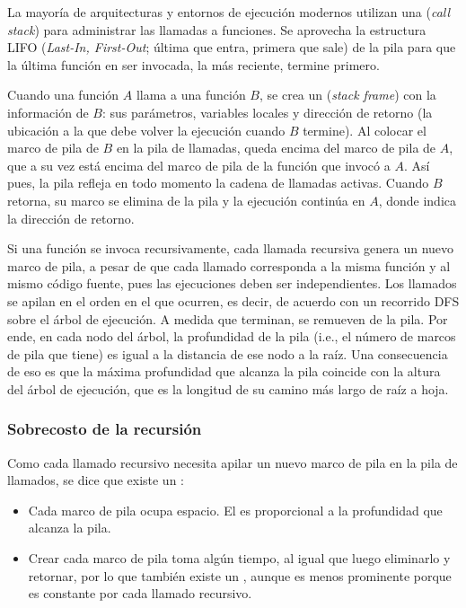 La mayoría de arquitecturas y entornos de ejecución modernos utilizan una  (\textit{call stack}) para administrar las llamadas a funciones. Se aprovecha la estructura LIFO (\textit{Last-In, First-Out}; última que entra, primera que sale) de la pila para que la última función en ser invocada, la más reciente, termine primero.

Cuando una función \(A\) llama a una función \(B\), se crea un  (\textit{stack frame}) con la información de \(B\): sus parámetros, variables locales y dirección de retorno (la ubicación a la que debe volver la ejecución cuando \(B\) termine). Al colocar el marco de pila de \(B\) en la pila de llamadas, queda encima del marco de pila de \(A\), que a su vez está encima del marco de pila de la función que invocó a \(A\). Así pues, la pila refleja en todo momento la cadena de llamadas activas. Cuando \(B\) retorna, su marco se elimina de la pila y la ejecución continúa en \(A\), donde indica la dirección de retorno.

Si una función se invoca recursivamente, cada llamada recursiva genera un nuevo marco de pila, a pesar de que cada llamado corresponda a la misma función y al mismo código fuente, pues las ejecuciones deben ser independientes. Los llamados se apilan en el orden en el que ocurren, es decir, de acuerdo con un recorrido DFS sobre el árbol de ejecución. A medida que terminan, se remueven de la pila. Por ende, en cada nodo del árbol, la profundidad de la pila (i.e., el número de marcos de pila que tiene) es igual a la distancia de ese nodo a la raíz. Una consecuencia de eso es que la máxima profundidad que alcanza la pila coincide con la altura del árbol de ejecución, que es la longitud de su camino más largo de raíz a hoja.

\subsubsection{Sobrecosto de la recursión}
\label{sec:sobrecosto_recursion}

Como cada llamado recursivo necesita apilar un nuevo marco de pila en la pila de llamados, se dice que existe un :
\begin{itemize}
  \item Cada marco de pila ocupa espacio. El  es proporcional a la profundidad que alcanza la pila.
  \item Crear cada marco de pila toma algún tiempo, al igual que luego eliminarlo y retornar, por lo que también existe un , aunque es menos prominente porque es constante por cada llamado recursivo.
\end{itemize}

